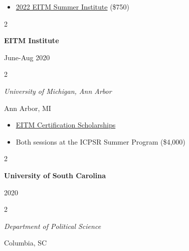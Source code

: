 \documentclass[
  16,
]{article}
\providecommand{\tightlist}{%
  \setlength{\itemsep}{0pt}\setlength{\parskip}{0pt}}
\begin{document}
\begin{itemize}
\tightlist
\item
  \href{https://eitminstitute.org/institute/2022/}{2022 EITM Summer Institute}
  (\$750)
\end{itemize}

\vspace{7pt}

\begin{large}
  \begin{multicols}{2}
    \begin{flushleft}{\bf EITM Institute}\end{flushleft}
    \begin{flushright}June-Aug 2020\end{flushright}
  \end{multicols}
  \begin{multicols}{2}
    \begin{flushleft}\textit{University of Michigan, Ann Arbor}\end
    {flushleft}\begin{flushright}Ann Arbor, MI\end
    {flushright}
  \end{multicols}
\end{large}
\vspace{-0.16cm}

\begin{itemize}
\tightlist
\item
  \href{https://52.2.147.143/icpsrweb/content/sumprog/scholarships/winners-2020.html}{EITM Certification Scholarships}
\item
  Both sessions at the ICPSR Summer Program (\$4,000)
\end{itemize}

\vspace{7pt}

\begin{large}
  \begin{multicols}{2}
    \begin{flushleft}{\bf University of South Carolina}\end{flushleft}
    \begin{flushright}2020\end{flushright}
  \end{multicols}
  \vspace{-0.17cm}
  \begin{multicols}{2}
    \begin{flushleft}\textit{Department of Political Science}\end
    {flushleft}\begin{flushright}Columbia, SC\end
    {flushright}
  \end{multicols}
\end{large}
\vspace{-0.16cm}
\end{document}
